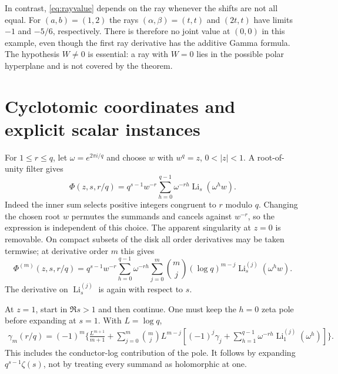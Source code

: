 \documentclass[11pt,a4paper]{article}
\numberwithin{equation}{section}
\theoremstyle{definition}\newtheorem{definition}[theorem]{Definition}
\theoremstyle{remark}\newtheorem{remark}[theorem]{Remark}
\DeclareMathOperator{\Li}{Li}
\begin{document}
In contrast, \eqref{eq:rayvalue} depends on the ray whenever the shifts
are not all equal. For $(a,b)=(1,2)$ the rays $(\alpha,\beta)=(t,t)$
and $(2t,t)$ have limits $-1$ and $-5/6$, respectively. There is
therefore no joint value at $(0,0)$ in this example, even though the
first ray derivative has the additive Gamma formula. The hypothesis
$W\ne0$ is essential: a ray with $W=0$ lies in the possible polar
hyperplane and is not covered by the theorem.

\section{Cyclotomic coordinates and explicit scalar instances}
\label{sec:cyclotomic}
For $1\le r\le q$, let $\omega=e^{2\pi i/q}$ and choose $w$ with
$w^q=z$, $0<|z|<1$. A root-of-unity filter gives
\begin{equation}
 \Phi(z,s,r/q)=q^{s-1}w^{-r}
       \sum_{h=0}^{q-1}\omega^{-rh}\Li_s(\omega^h w).
 \label{eq:rootfilter}
\end{equation}
Indeed the inner sum selects positive integers congruent to $r$ modulo
$q$. Changing the chosen root $w$ permutes the summands and cancels
against $w^{-r}$, so the expression is independent of this choice.
The apparent singularity at $z=0$ is removable. On compact subsets of
the disk all order derivatives may be taken termwise; at derivative
order $m$ this gives
\begin{equation}
 \Phi^{(m)}(z,s,r/q)=q^{s-1}w^{-r}
  \sum_{h=0}^{q-1}\omega^{-rh}
    \sum_{j=0}^m\binom mj(\log q)^{m-j}
                        \Li_s^{(j)}(\omega^hw).
 \label{eq:rootjets}
\end{equation}
The derivative on $\Li_s^{(j)}$ is again with respect to $s$.

At $z=1$, start in $\Re s>1$ and then continue. One must keep the
$h=0$ zeta pole before expanding at $s=1$. With $L=\log q$,
\begin{align}
 \gamma_m(r/q)=(-1)^m\Bigg\{\frac{L^{m+1}}{m+1}
  +\sum_{j=0}^m\binom mj L^{m-j}
   \left[(-1)^j\gamma_j+
       \sum_{h=1}^{q-1}\omega^{-rh}\Li_1^{(j)}(\omega^h)\right]\Bigg\}.
 \label{eq:Stieltjesfilter}
\end{align}
This includes the conductor-log contribution of the pole. It follows
by expanding $q^{s-1}\zeta(s)$, not by treating every summand as
holomorphic at one.
\end{document}
